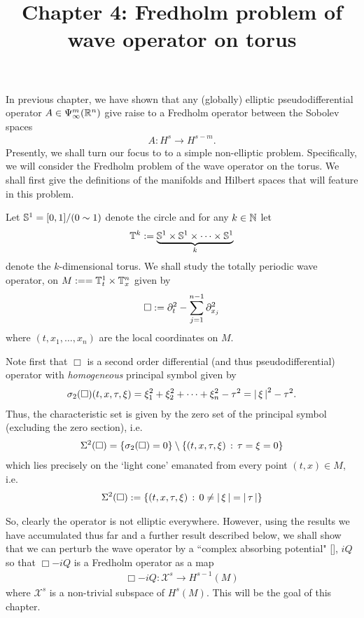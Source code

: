 \documentclass[12pt]{article}
\title{Chapter 4: Fredholm problem of wave operator on torus}
\date{}
\begin{document}
\maketitle
In previous chapter, we have shown that any (globally) elliptic pseudodifferential operator $A \in \Psi^{m}_{\infty}(\R^n)$ give raise to a Fredholm operator between the Sobolev spaces
\begin{align*}
A : H^s \to H^{s - m}. 
\end{align*}
Presently, we shall turn our focus to to a simple non-elliptic problem. Specifically, we will consider the Fredholm problem of the wave operator on the torus. We shall first give the definitions of the manifolds and Hilbert spaces that will feature in this problem. \\

\begin{fdefinition} 
Let $\S^1 = [0,1] / (0 \sim 1)$ denote the circle and for any $k \in \N$ let
\begin{align*}
\T^k := \underbrace{\S^1 \times \S^1 \times \dots \times \S^1}_{k}
\end{align*}
denote the $k$-dimensional torus. We shall study the totally periodic wave operator, on $M :=  = \T_t^1 \times \T_x^{n}$ given by
\begin{align}\label{eq: d'Alembertian}
\Box := \p_t^2 - \sum_{j = 1}^{n -1} \p_{x_j}^2
\end{align}
where $(t, x_1, \dots, x_n)$ are the local coordinates on $M$. 
\end{fdefinition}
Note first that $\Box$ is a second order differential (and thus pseudodifferential) operator with \textit{homogeneous} principal symbol given by 
\begin{align*}
\sigma_2(\Box)(t, x, \tau, \xi) = \xi_1^2 + \xi_2^2 + \dots + \xi_{n}^2 - \tau^2 = \abs{\xi}^2 - \tau^2. 
\end{align*}
Thus, the characteristic set is given by the zero set of the principal symbol (excluding the zero section), i.e. 
\begin{align*}
\Char^2(\Box) = \set{\sigma_2(\Box) = 0} \setminus \set{(t, x, \tau, \xi) \wh \tau = \xi = 0}
\end{align*}
which lies precisely on the `light cone' emanated from every point $(t, x) \in M$, i.e.  
\begin{align*}
\Char^2(\Box) := \set{(t, x, \tau, \xi) \wh 0 \neq \abs{\xi}  = \abs{\tau}} 
\end{align*} 

So, clearly the operator is not elliptic everywhere. However, using the results we have accumulated thus far and a further result described below, we shall show that we can perturb the wave operator by a ``complex absorbing potential" \ref{}, $iQ$ so that $\Box - iQ$ is a Fredholm operator as a map 
\begin{align*}
\Box - iQ : \mathcal{X}^s \to H^{s -1}(M)
\end{align*}
where $\mathcal{X}^s$ is a non-trivial subspace of $H^s(M)$. This will be the goal of this chapter. 
\end{document}

